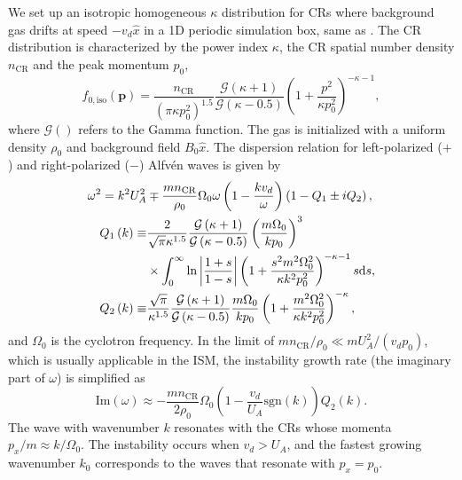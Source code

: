\documentclass[fleqn,usenatbib]{mnras}
\begin{document}
We set up an isotropic homogeneous  $\kappa$ distribution for CRs where background gas drifts at speed $-v_d \hat{x}$ in a 1D periodic simulation box, same as \citet{2019ApJ...876...60B}. The CR distribution is characterized by the power index $\kappa$, the CR spatial number density $n_\text{CR}$ and the peak momentum $p_0$,
\begin{equation}
    f_{0,\text{iso}}\left(\boldsymbol{p}\right) = \frac{n_\text{CR}}{\left(\pi \kappa p_0^2\right)^{1.5}} \frac{\mathcal{G}\left(\kappa + 1\right)}{\mathcal{G}\left(\kappa - 0.5 \right)}\left(1 + \frac{p^2}{\kappa p_0^2}\right)^{-\kappa - 1}, \label{equ::kappa_dist_iso}
\end{equation}
where  $\mathcal{G}()$ refers to the Gamma function.
The gas
is initialized with a uniform density $\rho_0$ and 
background field $B_0 \hat{x}$. 
The dispersion relation
for left-polarized ($+$) and right-polarized ($-$) Alfv\'en waves is given by
\begin{align}
	\omega^2 = k^2 U_A^2 & \mp \frac{m n_\text{CR}}{\rho_0} \Omega_0 \omega \left(1 - \frac{k v_d}{\omega} \right) \left(1 - Q_1 \pm i Q_2 \right), \label{equ::crsi_dispersion} \\
	Q_1\left(k\right) \equiv& \frac{2}{\sqrt{\pi}\kappa^{1.5}}\frac{\mathcal{G}\left(\kappa + 1\right)}{\mathcal{G}\left(\kappa - 0.5 \right)} \left(\frac{m\Omega_0}{k p_0}\right)^3 \notag \\ &\times  \int_0^\infty \ln\left| \frac{1+s}{1-s}\right| \left(1 + \frac{s^2 m^2\Omega_0^2}{\kappa k^2 p_0^2}\right)^{-\kappa - 1} s \dd s, \\
	Q_2\left(k\right) \equiv& \frac{\sqrt{\pi}}{\kappa^{1.5}}\frac{\mathcal{G}\left(\kappa + 1\right)}{\mathcal{G}\left(\kappa - 0.5 \right)} \frac{m\Omega_0}{k p_0} \left(1 + \frac{m^2\Omega_0^2}{\kappa k^2 p_0^2}\right)^{-\kappa}, \label{equ::gyro_resonance_q}
\end{align}
and $\Omega_0$ is the cyclotron frequency.
In the limit of $mn_\text{CR}/\rho_0\ll m U_A^2/(v_dp_0)$, which is usually applicable in the ISM, the
instability growth rate (the imaginary part of $\omega$) is simplified as
\begin{equation*}
	\text{Im}\left(\omega\right) \approx - \frac{m n_\text{CR}}{2 \rho_0} \Omega_0 \left(1 - \frac{v_d}{U_A} \text{sgn}\left(k\right) \right) Q_2 \left(k\right).
\end{equation*}
The wave with wavenumber $k$ resonates with the CRs whose momenta $p_x/m \approx k/\Omega_0$. The instability occurs when $v_d>U_A$, and the fastest growing wavenumber $k_0$ corresponds to the waves that resonate with $p_x=p_0$.
\end{document}

